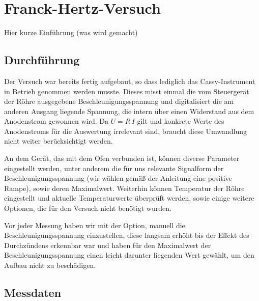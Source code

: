 \documentclass[11pt, a4paper]{article}
\begin{document}
\section{Franck-Hertz-Versuch}
Hier kurze Einführung (was wird gemacht)

\subsection{Durchführung}

Der Versuch war bereits fertig aufgebaut, so dass lediglich das Cassy-Instrument in Betrieb genommen werden musste.
Dieses misst einmal die vom Steuergerät der Röhre ausgegebene Beschleunigungsspannung und digitalisiert die am anderen Ausgang liegende Spannung, die intern über einen Widerstand aus dem Anodenstrom gewonnen wird.
Da $U=R\,I$ gilt und konkrete Werte des Anodenstroms für die Auswertung irrelevant sind, braucht diese Umwandlung nicht weiter berücksichtigt werden.

An dem Gerät, das mit dem Ofen verbunden ist, können diverse Parameter eingestellt werden, unter anderem die für uns relevante Signalform der Beschleunigungsspannung (wir wählen gemäß der Anleitung eine positive Rampe), sowie deren Maximalwert.
Weiterhin können Temperatur der Röhre eingestellt und aktuelle Temperaturwerte überprüft werden, sowie einige weitere Optionen, die für den Versuch nicht benötigt wurden.

Vor jeder Messung haben wir mit der Option, manuell die Beschleunigungsspannung einzustellen, diese langsam erhöht bis der Effekt des Durchzündens erkennbar war und haben für den Maximalwert der Beschleunigungsspannung einen leicht darunter liegenden Wert gewählt, um den Aufbau nicht zu beschädigen.

\subsection{Messdaten}
\end{document}
